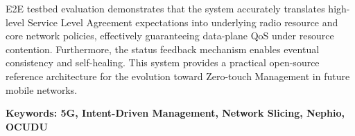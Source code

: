 E2E testbed evaluation demonstrates that the system accurately translates high-level Service Level Agreement expectations into underlying radio resource and core network policies, effectively guaranteeing data-plane QoS under resource contention. Furthermore, the status feedback mechanism enables eventual consistency and self-healing. This system provides a practical open-source reference architecture for the evolution toward Zero-touch Management in future mobile networks.

\vspace{1cm}

\textbf{Keywords: 5G, Intent-Driven Management, Network Slicing, Nephio, OCUDU} 
